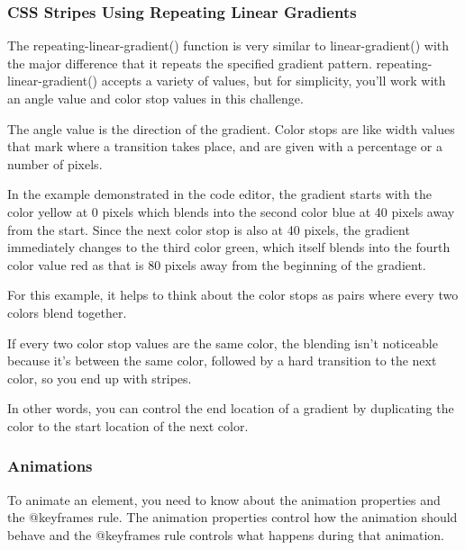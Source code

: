 \subsubsection{CSS Stripes Using Repeating Linear Gradients}


The repeating-linear-gradient() function is very similar to linear-gradient() with the major difference that it repeats the specified gradient pattern. repeating-linear-gradient() accepts a variety of values, but for simplicity, you'll work with an angle value and color stop values in this challenge.

The angle value is the direction of the gradient. Color stops are like width values that mark where a transition takes place, and are given with a percentage or a number of pixels.

In the example demonstrated in the code editor, the gradient starts with the color yellow at 0 pixels which blends into the second color blue at 40 pixels away from the start. Since the next color stop is also at 40 pixels, the gradient immediately changes to the third color green, which itself blends into the fourth color value red as that is 80 pixels away from the beginning of the gradient.

For this example, it helps to think about the color stops as pairs where every two colors blend together.


If every two color stop values are the same color, the blending isn't noticeable because it's between the same color, followed by a hard transition to the next color, so you end up with stripes.

In other words, you can control the end location of a gradient by duplicating the color to the start location of the next color.


\subsubsection{Animations}

To animate an element, you need to know about the animation properties and the @keyframes rule. The animation properties control how the animation should behave and the @keyframes rule controls what happens during that animation.

